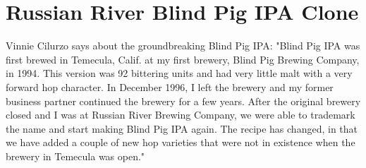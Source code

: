 \documentclass[10pt,oneside]{scrbook}
\begin{document}
\pagebreak

\begin{ingredientsblock}

\begin{malts}
\end{malts}

\begin{hops}
\end{hops}

\begin{yeasts}
\end{yeasts}

\end{ingredientsblock}

\chapter*{Russian River Blind Pig IPA Clone}

\begin{aboutblock}
Vinnie Cilurzo says about the groundbreaking Blind Pig IPA: "Blind Pig IPA was first brewed
in Temecula, Calif. at my first brewery, Blind Pig Brewing Company, in 1994. This version
was 92 bittering units and had very little malt with a very forward hop character. In December
1996, I left the brewery and my former business partner continued the brewery for a few years.
After the original brewery closed and I was at Russian River Brewing Company, we were able to
trademark the name and start making Blind Pig IPA again. The recipe has changed, in that we have
added a couple of new hop varieties that were not in existence when the brewery in Temecula was 
open."
\end{aboutblock}
\end{document}
